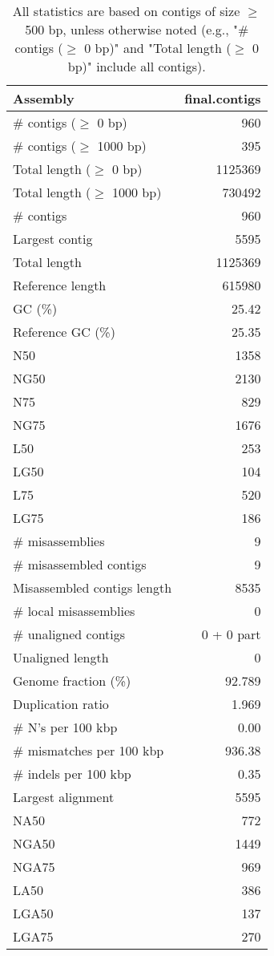 \documentclass[12pt,a4paper]{article}
\begin{document}
\begin{table}[ht]
\begin{center}
\caption{All statistics are based on contigs of size $\geq$ 500 bp, unless otherwise noted (e.g., "\# contigs ($\geq$ 0 bp)" and "Total length ($\geq$ 0 bp)" include all contigs).}
\begin{tabular}{|l*{1}{|r}|}
\hline
Assembly & final.contigs \\ \hline
\# contigs ($\geq$ 0 bp) & 960 \\ \hline
\# contigs ($\geq$ 1000 bp) & 395 \\ \hline
Total length ($\geq$ 0 bp) & 1125369 \\ \hline
Total length ($\geq$ 1000 bp) & 730492 \\ \hline
\# contigs & 960 \\ \hline
Largest contig & 5595 \\ \hline
Total length & 1125369 \\ \hline
Reference length & 615980 \\ \hline
GC (\%) & 25.42 \\ \hline
Reference GC (\%) & 25.35 \\ \hline
N50 & 1358 \\ \hline
NG50 & 2130 \\ \hline
N75 & 829 \\ \hline
NG75 & 1676 \\ \hline
L50 & 253 \\ \hline
LG50 & 104 \\ \hline
L75 & 520 \\ \hline
LG75 & 186 \\ \hline
\# misassemblies & 9 \\ \hline
\# misassembled contigs & 9 \\ \hline
Misassembled contigs length & 8535 \\ \hline
\# local misassemblies & 0 \\ \hline
\# unaligned contigs & 0 + 0 part \\ \hline
Unaligned length & 0 \\ \hline
Genome fraction (\%) & 92.789 \\ \hline
Duplication ratio & 1.969 \\ \hline
\# N's per 100 kbp & 0.00 \\ \hline
\# mismatches per 100 kbp & 936.38 \\ \hline
\# indels per 100 kbp & 0.35 \\ \hline
Largest alignment & 5595 \\ \hline
NA50 & 772 \\ \hline
NGA50 & 1449 \\ \hline
NGA75 & 969 \\ \hline
LA50 & 386 \\ \hline
LGA50 & 137 \\ \hline
LGA75 & 270 \\ \hline
\end{tabular}
\end{center}
\end{table}
\end{document}

